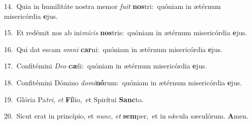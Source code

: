 {\numbfont\textcolor{\numbcolor}{14.}}~Quia in humilitáte nostra memor \textit{fu}\-\textit{it} \textbf{nos}\-tri:~\star quóniam in ætérnum misericórdia \textbf{e}\-jus.\par
{\numbfont\textcolor{\numbcolor}{15.}}~Et redémit nos ab ini\-\textit{mí}\-\textit{cis} \textbf{nos}\-tris:~\star quóniam in ætérnum misericórdia \textbf{e}\-jus.\par
{\numbfont\textcolor{\numbcolor}{16.}}~Qui dat escam \textit{om}\-\textit{ni} \textbf{car}\-ni:~\star quóniam in ætérnum misericórdia \textbf{e}\-jus.\par
{\numbfont\textcolor{\numbcolor}{17.}}~Confitémini \textit{De}\-\textit{o} \textbf{cæ}\-li:~\star quóniam in ætérnum misericórdia \textbf{e}\-jus.\par
{\numbfont\textcolor{\numbcolor}{18.}}~Confitémini Dómino \textit{do}\-\textit{mi}\textbf{nó}rum:~\star quóniam in ætérnum misericórdia \textbf{e}\-jus.\par
{\numbfont\textcolor{\numbcolor}{19.}}~Glória Pa\-\textit{tri}\-, \textit{et} \textbf{Fí}\-lio,~\star et Spirítui \textbf{Sanc}\-to.\par
{\numbfont\textcolor{\numbcolor}{20.}}~Sicut erat in princípio, et \textit{nunc}\-, \textit{et} \textbf{sem}\-per,~\star et in sǽcula sæculórum. \textbf{A}\-men.\par
